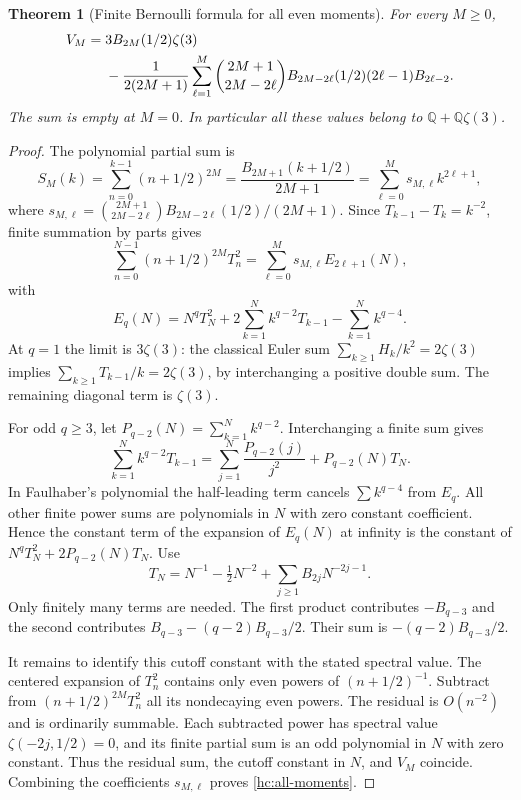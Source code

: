 \documentclass[11pt]{article}
\numberwithin{equation}{section}
\newtheorem{theorem}{Theorem}[section]
\theoremstyle{definition}
\theoremstyle{remark}
\begin{document}
\begin{theorem}[Finite Bernoulli formula for all even moments]
\label{hc:trigamma}
For every $M\ge0$,
\begin{align}\label{hc:all-moments}
 V_M={}&3B_{2M}(1/2)\zeta(3)\notag\\
 &-\frac1{2(2M+1)}\sum_{\ell=1}^{M}
 \binom{2M+1}{2M-2\ell}B_{2M-2\ell}(1/2)
                     (2\ell-1)B_{2\ell-2}.
\end{align}
The sum is empty at $M=0$. In particular all these values belong
to $\mathbb Q+\mathbb Q\zeta(3)$.
\end{theorem}
\begin{proof}
The polynomial partial sum is
\[
 S_M(k)=\sum_{n=0}^{k-1}(n+1/2)^{2M}
 =\frac{B_{2M+1}(k+1/2)}{2M+1}
 =\sum_{\ell=0}^M s_{M,\ell} k^{2\ell+1},
\]
where
$s_{M,\ell}=\binom{2M+1}{2M-2\ell}B_{2M-2\ell}(1/2)/(2M+1)$.
Since $T_{k-1}-T_k=k^{-2}$, finite summation by parts gives
\[
 \sum_{n=0}^{N-1}(n+1/2)^{2M}T_n^2
 =\sum_{\ell=0}^M s_{M,\ell}E_{2\ell+1}(N),
\]
with
\[
 E_q(N)=N^qT_N^2+2\sum_{k=1}^N k^{q-2}T_{k-1}
                                -\sum_{k=1}^N k^{q-4}.
\]
At $q=1$ the limit is $3\zeta(3)$: the classical Euler sum \cite{Can}
$\sum_{k\ge1}H_k/k^2=2\zeta(3)$ implies
$\sum_{k\ge1}T_{k-1}/k=2\zeta(3)$, by interchanging a positive
double sum. The remaining diagonal term is $\zeta(3)$.

For odd $q\ge3$, let $P_{q-2}(N)=\sum_{k=1}^N k^{q-2}$.
Interchanging a finite sum gives
\[
 \sum_{k=1}^N k^{q-2}T_{k-1}
   =\sum_{j=1}^N\frac{P_{q-2}(j)}{j^2}
                                +P_{q-2}(N)T_N.
\]
In Faulhaber's polynomial the half-leading term cancels
$\sum k^{q-4}$ from $E_q$. All other finite power sums are
polynomials in $N$ with zero constant coefficient. Hence the
constant term of the expansion of $E_q(N)$ at infinity is the
constant of $N^qT_N^2+2P_{q-2}(N)T_N$.
Use
\[
 T_N=N^{-1}-\tfrac12N^{-2}
                   +\sum_{j\ge1}B_{2j}N^{-2j-1}.
\]
Only finitely many terms are needed. The first product contributes
$-B_{q-3}$ and the second contributes
$B_{q-3}-(q-2)B_{q-3}/2$. Their sum is
$-(q-2)B_{q-3}/2$.

It remains to identify this cutoff constant with the stated
spectral value. The centered expansion of $T_n^2$ contains only
even powers of $(n+1/2)^{-1}$. Subtract from
$(n+1/2)^{2M}T_n^2$ all its nondecaying even powers. The residual
is $O(n^{-2})$ and is ordinarily summable. Each subtracted power
has spectral value $\zeta(-2j,1/2)=0$, and its finite partial sum
is an odd polynomial in $N$ with zero constant. Thus the residual
sum, the cutoff constant in $N$, and $V_M$ coincide. Combining
the coefficients $s_{M,\ell}$ proves \eqref{hc:all-moments}.
\end{proof}
\end{document}
